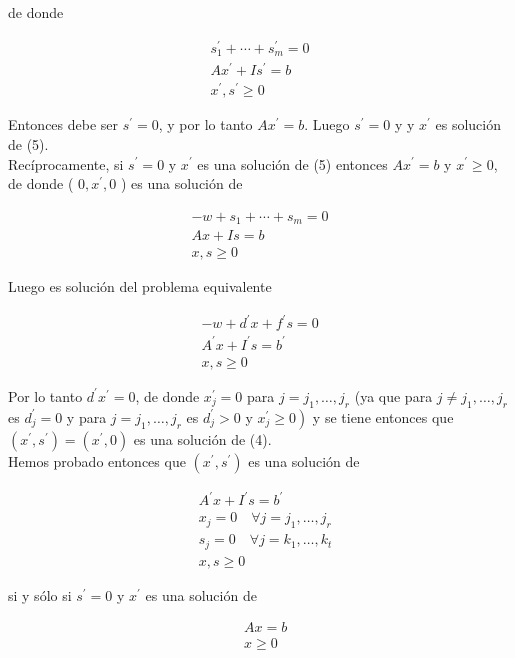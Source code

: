 \documentclass[10pt]{article}
\begin{document}
de donde

$$
\begin{gathered}
s_{1}^{\prime}+\cdots+s_{m}^{\prime}=0 \\
A x^{\prime}+I s^{\prime}=b \\
x^{\prime}, s^{\prime} \geq 0
\end{gathered}
$$

Entonces debe ser $s^{\prime}=0$, y por lo tanto $A x^{\prime}=b$. Luego $s^{\prime}=0$ y y $x^{\prime}$ es solución de (5).\\
Recíprocamente, si $s^{\prime}=0$ y $x^{\prime}$ es una solución de (5) entonces $A x^{\prime}=b$ y $x^{\prime} \geq 0$, de donde ( $0, x^{\prime}, 0$ ) es una solución de

$$
\begin{array}{r}
-w+s_{1}+\cdots+s_{m}=0 \\
A x+I s=b \\
x, s \geq 0
\end{array}
$$

Luego es solución del problema equivalente

$$
\begin{gathered}
-w+d^{\prime} x+f^{\prime} s=0 \\
A^{\prime} x+I^{\prime} s=b^{\prime} \\
x, s \geq 0
\end{gathered}
$$

Por lo tanto $d^{\prime} x^{\prime}=0$, de donde $x_{j}^{\prime}=0$ para $j=j_{1}, \ldots, j_{r}$ (ya que para $j \neq j_{1}, \ldots, j_{r}$ es $d_{j}^{\prime}=0$ y para $j=j_{1}, \ldots, j_{r}$ es $d_{j}^{\prime}>0$ y $\left.x_{j}^{\prime} \geq 0\right)$ y se tiene entonces que $\left(x^{\prime}, s^{\prime}\right)=\left(x^{\prime}, 0\right)$ es una solución de (4).\\
Hemos probado entonces que $\left(x^{\prime}, s^{\prime}\right)$ es una solución de

$$
\begin{aligned}
& A^{\prime} x+I^{\prime} s=b^{\prime} \\
& x_{j}=0 \quad \forall j=j_{1}, \ldots, j_{r} \\
& s_{j}=0 \quad \forall j=k_{1}, \ldots, k_{t} \\
& x, s \geq 0
\end{aligned}
$$

si y sólo si $s^{\prime}=0$ y $x^{\prime}$ es una solución de


\begin{align*}
& A x=b  \tag{5}\\
& x \geq 0
\end{align*}
\end{document}

